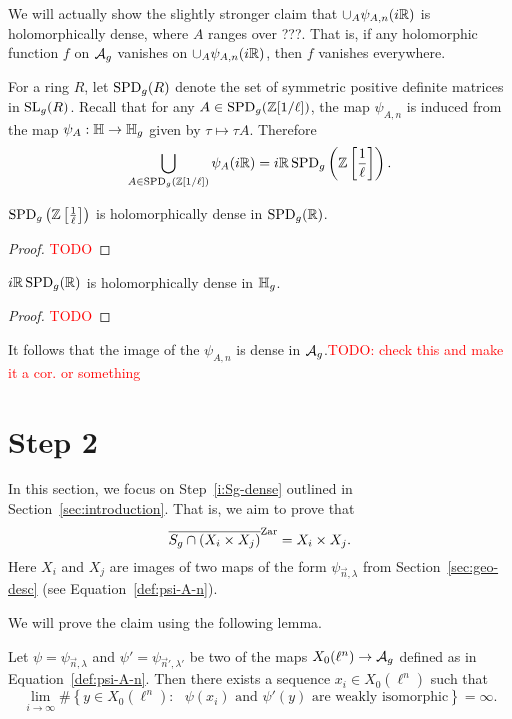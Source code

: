 \documentclass{amsart}
\begin{document}
We will actually show the slightly stronger claim that $\cup_{A} \psi_{A,n}(i\mathbb{R})$ is holomorphically dense, where $A$ ranges over ???. That is, if any holomorphic function $f$ on $\mathcal{A}_g$ vanishes on $\cup_{A} \psi_{A,n}(i\mathbb{R})$, then $f$ vanishes everywhere.

For a ring $R$, let $\operatorname{SPD}_g(R)$ denote the set of symmetric positive definite matrices in $\operatorname{SL}_g(R)$. Recall that for any $A \in \operatorname{SPD}_g(\mathbb{Z}[1/\ell])$, the map $\psi_{A,n}$ is induced from the map $\psi_A: \mathbb{H} \to \mathbb{H}_g$ given by $\tau \mapsto \tau A$. Therefore
\[
  \bigcup_{A \in \operatorname{SPD}_g(\mathbb{Z}[1/\ell])} \psi_A(i\mathbb{R}) = i\mathbb{R}\operatorname{SPD}_g\left(\mathbb{Z}\left[\frac{1}{\ell}\right]\right).
\]

\begin{lemma}
  $\operatorname{SPD}_g\left(\mathbb{Z}\left[\frac{1}{\ell}\right]\right)$ is holomorphically dense in $\operatorname{SPD}_g(\mathbb{R})$.
\end{lemma}
\begin{proof}
  \textcolor{red}{TODO}
\end{proof}

\begin{lemma}
  $i\mathbb{R}\operatorname{SPD}_g(\mathbb{R})$ is holomorphically dense in $\mathbb{H}_g$.
\end{lemma}
\begin{proof}
  \textcolor{red}{TODO}
\end{proof}

It follows that the image of the $\psi_{A,n}$ is dense in $\mathcal{A}_g$.\textcolor{red}{TODO: check this and make it a cor. or something}

\section{Step 2}
\label{sec:step-2}

In this section, we focus on Step~\ref{i:Sg-dense} outlined in Section~\ref{sec:introduction}. That is, we aim to prove that
\[
  \overline{S_g \cap (X_i \times X_j)}^\mathrm{Zar} = X_i \times X_j.
\]
Here $X_i$ and $X_j$ are images of two maps of the form $\psi_{\vec{n},\lambda}$ from Section~\ref{sec:geo-desc} (see Equation~\ref{def:psi-A-n}).

We will prove the claim using the following lemma.

\begin{lemma}\label{lem:lim-degree}
  Let $\psi = \psi_{\vec{n},\lambda}$ and $\psi' = \psi_{\vec{n}',\lambda'}$ be two of the maps $X_0(\ell^n) \to \mathcal{A}_g$ defined as in Equation~\ref{def:psi-A-n}. Then there exists a sequence $x_i \in X_0(\ell^n)$ such that
  \[
    \lim_{i \to \infty}\#\left\{ y \in X_0(\ell^n) \colon \text{ $\psi(x_i)$ and $\psi'(y)$ are weakly isomorphic} \right\} = \infty.
  \]
\end{lemma}
\end{document}

